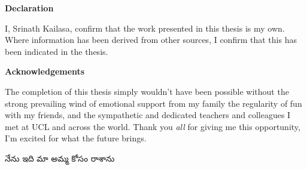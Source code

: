 \thispagestyle{plain}

\begin{center}
    \textbf{Declaration}
\end{center}
I, Srinath Kailasa, confirm that the work presented in this thesis is my own. Where information has been derived from other sources, I confirm that this has been indicated in the thesis.


\begin{center}
    \textbf{Acknowledgements}
\end{center}

The completion of this thesis simply wouldn't have been possible without the strong prevailing wind of emotional support from my family the regularity of fun with my friends, and the sympathetic and dedicated teachers and colleagues I met at UCL and across the world. Thank you \textit{all} for giving me this opportunity, I'm excited for what the future brings.

\begin{center}
   {\tel నేను ఇది మా అమ్మ కోసం రాశాను}
\end{center}